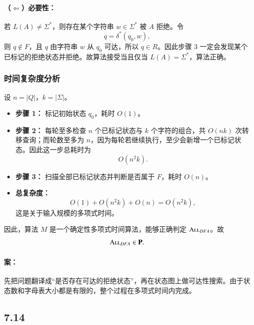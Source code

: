\begin{answerred}
\paragraph{（$\Leftarrow$）必要性：}
若 $L(A) \neq \Sigma^*$，则存在某个字符串 $w \in \Sigma^*$ 被 $A$ 拒绝。令
\[
    q = \delta^*(q_0,w),
\]
则 $q \notin F$，且 $q$ 由字符串 $w$ 从 $q_0$ 可达，所以 $q \in R$。因此步骤 3 一定会发现某个已标记的拒绝状态并拒绝。故算法接受当且仅当 $L(A) = \Sigma^*$，算法正确。

\subsubsection*{时间复杂度分析}

设 $n = |Q|$，$k = |\Sigma|$。

\begin{itemize}
  \item \textbf{步骤 1：} 标记初始状态 $q_0$，耗时 $O(1)$。

  \item \textbf{步骤 2：} 每轮至多检查 $n$ 个已标记状态与 $k$ 个字符的组合，共 $O(nk)$ 次转移查询；而轮数至多为 $n$，因为每轮若继续执行，至少会新增一个已标记状态。因此这一步总耗时为
  \[
      O(n^2k).
  \]

  \item \textbf{步骤 3：} 扫描全部已标记状态并判断是否属于 $F$，耗时 $O(n)$。

  \item \textbf{总复杂度：}
  \[
      O(1) + O(n^2k) + O(n) = O(n^2k),
  \]
  这是关于输入规模的多项式时间。
\end{itemize}

因此，算法 $M$ 是一个确定性多项式时间算法，能够正确判定 $\textsc{All}_{DFA}$。故
\[
    \textsc{All}_{DFA} \in \mathbf{P}.
\]

\begin{answernote}
\paragraph{案：} 先把问题翻译成“是否存在可达的拒绝状态”，再在状态图上做可达性搜索。由于状态数和字母表大小都是有限的，整个过程在多项式时间内完成。

\end{answernote}
\end{answerred}
\subsection*{7.14}

